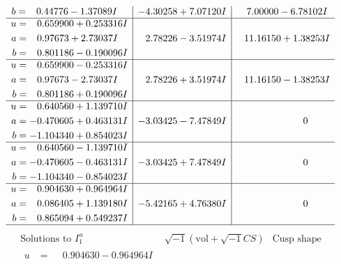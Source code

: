 \documentclass[1p]{elsarticle_modified}
\theoremstyle{definition}
\newcommand{\I}{\sqrt{-1}}
\begin{document}
$$\begin{array}{c|c|c}
\begin{aligned}
b &= \phantom{-}0.44776 - 1.37089 I\end{aligned}
 & -4.30258 + 7.07120 I & \phantom{-}7.00000 - 6.78102 I \\ \hline\begin{aligned}
u &= \phantom{-}0.659900 + 0.253316 I \\
a &= \phantom{-}0.97673 + 2.73037 I \\
b &= \phantom{-}0.801186 - 0.190096 I\end{aligned}
 & \phantom{-}2.78226 - 3.51974 I & \phantom{-}11.16150 + 1.38253 I \\ \hline\begin{aligned}
u &= \phantom{-}0.659900 - 0.253316 I \\
a &= \phantom{-}0.97673 - 2.73037 I \\
b &= \phantom{-}0.801186 + 0.190096 I\end{aligned}
 & \phantom{-}2.78226 + 3.51974 I & \phantom{-}11.16150 - 1.38253 I \\ \hline\begin{aligned}
u &= \phantom{-}0.640560 + 1.139710 I \\
a &= -0.470605 + 0.463131 I \\
b &= -1.104340 + 0.854023 I\end{aligned}
 & -3.03425 - 7.47849 I & \phantom{-0.000000 } 0 \\ \hline\begin{aligned}
u &= \phantom{-}0.640560 - 1.139710 I \\
a &= -0.470605 - 0.463131 I \\
b &= -1.104340 - 0.854023 I\end{aligned}
 & -3.03425 + 7.47849 I & \phantom{-0.000000 } 0 \\ \hline\begin{aligned}
u &= \phantom{-}0.904630 + 0.964964 I \\
a &= \phantom{-}0.086405 + 1.139180 I \\
b &= \phantom{-}0.865094 + 0.549237 I\end{aligned}
 & -5.42165 + 4.76380 I & \phantom{-0.000000 } 0\\
 \hline 
 \end{array}$$\newpage$$\begin{array}{c|c|c}  
\text{Solutions to }I^u_{1}& \I (\text{vol} + \sqrt{-1}CS) & \text{Cusp shape}\\
 \hline 
\begin{aligned}
u &= \phantom{-}0.904630 - 0.964964 I \\

\end{aligned}
\end{array}$$
\end{document}
